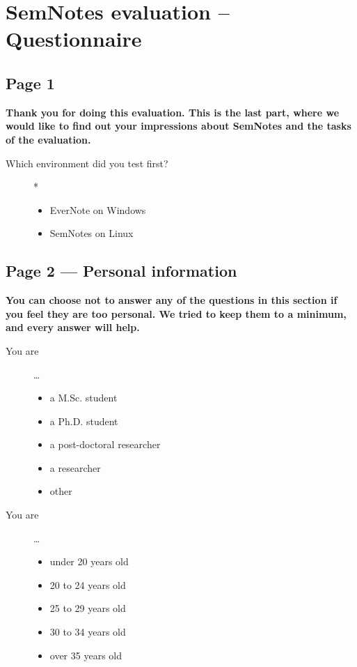 \chapter{SemNotes evaluation -- Questionnaire}
\label{ap:questionnaire}

\section*{Page 1}

\textbf{Thank you for doing this evaluation. This is the last part, where we would like to find out your impressions about SemNotes and the tasks of the evaluation. }

\begin{description}
 \item[Which environment did you test first?] *

\begin{itemize}[$\circ$]
  \item EverNote on Windows
  \item SemNotes on Linux
\end{itemize}
\end{description}

\section*{Page 2 ---  Personal information}

\textbf{You can choose not to answer any of the questions in this section if you feel they are too personal. We tried to keep them to a minimum, and every answer will help.}

\begin{description}
 \item[You are] \dots

\begin{itemize}[$\circ$]
\item a M.Sc. student
\item a Ph.D. student
\item a post-doctoral researcher
\item a researcher
\item other 
\end{itemize}
\end{description}

\begin{description}
 \item[You are] \dots

\begin{itemize}[$\circ$]
\item under 20 years old
\item 20 to 24 years old
\item 25 to 29 years old
\item 30 to 34 years old
\item over 35 years old
\end{itemize}
\end{description}

